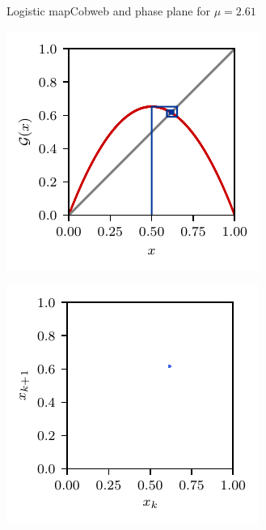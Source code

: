 \documentclass[usenames,dvipsnames,svgnames,10pt,aspectratio=169]{beamer}
\begin{document}
\begin{frame}[t, c]{Logistic map}{Cobweb and phase plane for $\mu = 2.61$}
	\begin{minipage}{.48\textwidth}
		\centering
		\includegraphics[width=.75\textwidth]{logistic_map_cobweb_plot_5}
	\end{minipage}%
	\begin{minipage}{.48\textwidth}
		\centering
		\includegraphics[width=.75\textwidth]{logistic_map_phase_plane_5}
	\end{minipage}

	\vspace{1cm}
\end{frame}
\end{document}
